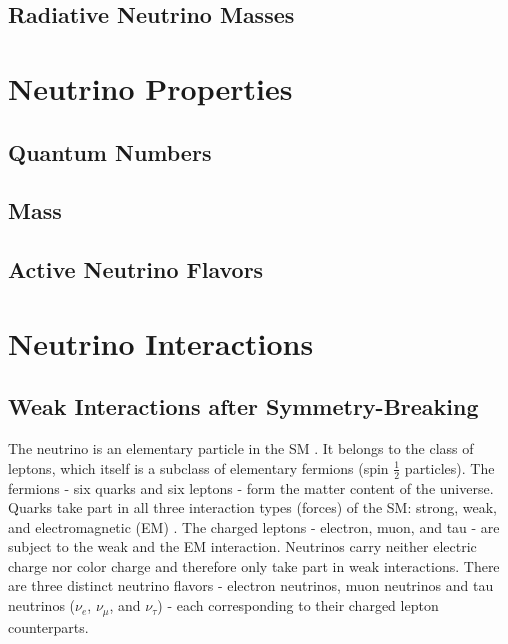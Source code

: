\subsection{Radiative Neutrino Masses}


\section{Neutrino Properties}

\subsection{Quantum Numbers}

\subsection{Mass}

\subsection{Active Neutrino Flavors}


\section{Neutrino Interactions} 

\subsection{Weak Interactions after Symmetry-Breaking}

The neutrino is an elementary particle in the SM .
It belongs to the class of leptons, which itself is a subclass of elementary fermions (spin ${\frac{1}{2}}$ particles).
The fermions - six quarks and six leptons - form the matter content of the universe.
Quarks take part in all three interaction types (forces) of the SM: strong, weak, and electromagnetic (EM) .
The charged leptons - electron, muon, and tau - are subject to the weak and the EM interaction.
Neutrinos carry neither electric charge nor color charge and therefore only take part in weak interactions.
There are three distinct neutrino flavors - electron neutrinos, muon neutrinos and tau neutrinos ($\nu_e$, $\nu_{\mu}$, and $\nu_{\tau}$)  - each corresponding to their charged lepton counterparts.

